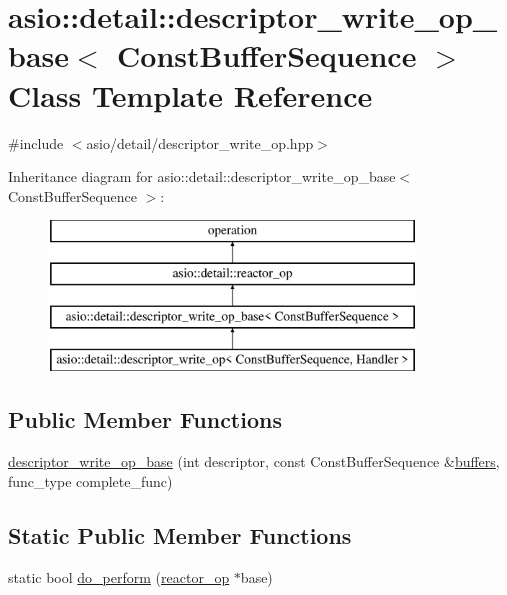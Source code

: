 \hypertarget{classasio_1_1detail_1_1descriptor__write__op__base}{}\section{asio\+:\+:detail\+:\+:descriptor\+\_\+write\+\_\+op\+\_\+base$<$ Const\+Buffer\+Sequence $>$ Class Template Reference}
\label{classasio_1_1detail_1_1descriptor__write__op__base}


{\ttfamily \#include $<$asio/detail/descriptor\+\_\+write\+\_\+op.\+hpp$>$}

Inheritance diagram for asio\+:\+:detail\+:\+:descriptor\+\_\+write\+\_\+op\+\_\+base$<$ Const\+Buffer\+Sequence $>$\+:\begin{figure}[H]
\begin{center}
\leavevmode
\includegraphics[height=4.000000cm]{classasio_1_1detail_1_1descriptor__write__op__base}
\end{center}
\end{figure}
\subsection*{Public Member Functions}
\begin{DoxyCompactItemize}
\item 
\hyperlink{classasio_1_1detail_1_1descriptor__write__op__base_a11389c8629eb24fc9aa39aeaaaf19378}{descriptor\+\_\+write\+\_\+op\+\_\+base} (int descriptor, const Const\+Buffer\+Sequence \&\hyperlink{group__async__read_ga54dede45c3175148a77fe6635222c47d}{buffers}, func\+\_\+type complete\+\_\+func)
\end{DoxyCompactItemize}
\subsection*{Static Public Member Functions}
\begin{DoxyCompactItemize}
\item 
static bool \hyperlink{classasio_1_1detail_1_1descriptor__write__op__base_ad60704fc894c44a39d192526ed51a96d}{do\+\_\+perform} (\hyperlink{classasio_1_1detail_1_1reactor__op}{reactor\+\_\+op} $\ast$base)
\end{DoxyCompactItemize}
